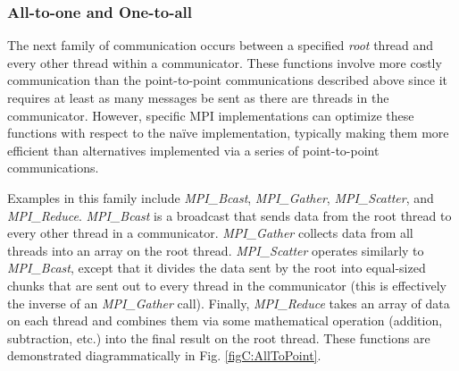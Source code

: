 \subsubsection{All-to-one and One-to-all}

The next family of communication occurs between a specified \emph{root} thread
and every other thread within a communicator. These functions involve more
costly communication than the point-to-point communications described above
since it requires at least as many messages be sent as there are threads in the
communicator. However, specific MPI implementations can optimize these functions
with respect to the na\"ive implementation, typically making them more efficient
than alternatives implemented via a series of point-to-point communications.

Examples in this family include \emph{MPI\_Bcast}, \emph{MPI\_Gather},
\emph{MPI\_Scatter}, and \emph{MPI\_Reduce}. \emph{MPI\_Bcast} is a broadcast
that sends data from the root thread to every other thread in a communicator.
\emph{MPI\_Gather} collects data from all threads into an array on the root
thread. \emph{MPI\_Scatter} operates similarly to \emph{MPI\_Bcast}, except that
it divides the data sent by the root into equal-sized chunks that are sent out
to every thread in the communicator (this is effectively the inverse of an
\emph{MPI\_Gather} call). Finally, \emph{MPI\_Reduce} takes an array of data on
each thread and combines them via some mathematical operation (\ie addition,
subtraction, etc.) into the final result on the root thread. These functions are
demonstrated diagrammatically in Fig. \ref{figC:AllToPoint}.

